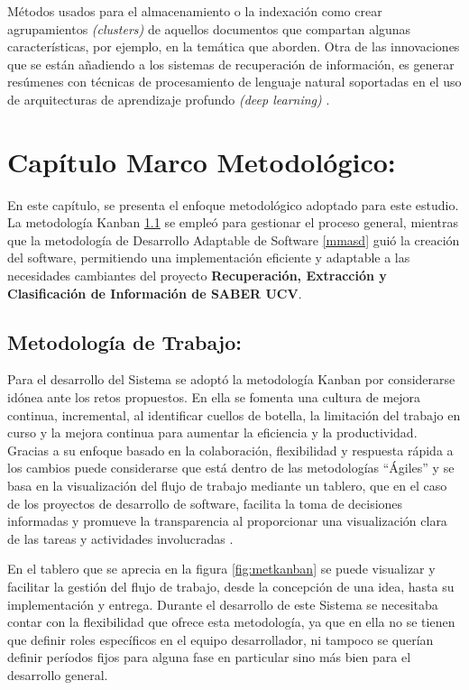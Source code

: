 \documentclass[
  10,
  openany]{book}
\begin{document}
Métodos usados para el almacenamiento o la indexación como crear agrupamientos \emph{(clusters)} de aquellos documentos que compartan algunas características, por ejemplo, en la temática que aborden. Otra de las innovaciones que se están añadiendo a los sistemas de recuperación de información, es generar resúmenes con técnicas de procesamiento de lenguaje natural soportadas en el uso de arquitecturas de aprendizaje profundo \emph{(deep learning)} .

\hypertarget{mm}{%
\chapter{Capítulo Marco Metodológico:}\label{mm}}

En este capítulo, se presenta el enfoque metodológico adoptado para este estudio. La metodología Kanban \ref{mmmetodologia} se empleó para gestionar el proceso general, mientras que la metodología de Desarrollo Adaptable de Software \ref{mmasd} guió la creación del software, permitiendo una implementación eficiente y adaptable a las necesidades cambiantes del proyecto \textbf{Recuperación, Extracción y Clasificación de Información de SABER UCV}.

\hypertarget{mmmetodologia}{%
\section{Metodología de Trabajo:}\label{mmmetodologia}}

Para el desarrollo del Sistema se adoptó la metodología Kanban por considerarse idónea ante los retos propuestos. En ella se fomenta una cultura de mejora continua, incremental, al identificar cuellos de botella, la limitación del trabajo en curso y la mejora continua para aumentar la eficiencia y la productividad. Gracias a su enfoque basado en la colaboración, flexibilidad y respuesta rápida a los cambios puede considerarse que está dentro de las metodologías ``Ágiles'' y se basa en la visualización del flujo de trabajo mediante un tablero, que en el caso de los proyectos de desarrollo de software, facilita la toma de decisiones informadas y promueve la transparencia al proporcionar una visualización clara de las tareas y actividades involucradas \citep{stephens2015}.

En el tablero que se aprecia en la figura \ref{fig:metkanban} se puede visualizar y facilitar la gestión del flujo de trabajo, desde la concepción de una idea, hasta su implementación y entrega. Durante el desarrollo de este Sistema se necesitaba contar con la flexibilidad que ofrece esta metodología, ya que en ella no se tienen que definir roles específicos en el equipo desarrollador, ni tampoco se querían definir períodos fijos para alguna fase en particular sino más bien para el desarrollo general.
\end{document}

